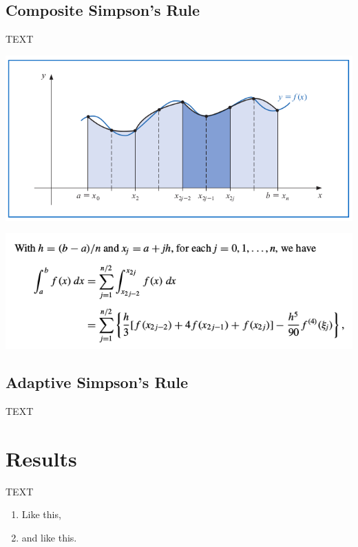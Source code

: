 \documentclass[a4paper]{article}
\begin{document}
\subsection{Composite Simpson's Rule}
TEXT

\begin{center}
	\includegraphics[width=1\textwidth]{../additional/simpsons_fig.png}
	\label{fig:sim_fig}
\end{center}

\begin{center}
	\includegraphics[width=1\textwidth]{../additional/simpsons_eq.png}
	\label{fig:sim_eq}
\end{center}


\subsection{Adaptive Simpson's Rule}
TEXT



\newpage
\section{Results}
\label{sec:results}

TEXT


\begin{enumerate}
\item Like this,
\item and like this.
\end{enumerate}
\end{document}
